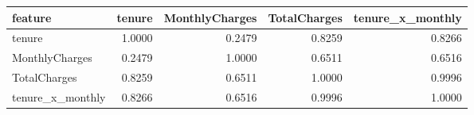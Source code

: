 \begin{tabular}{lrrrr}
\toprule
feature & tenure & MonthlyCharges & TotalCharges & tenure\_x\_monthly \\
\midrule
tenure & 1.0000 & 0.2479 & 0.8259 & 0.8266 \\
MonthlyCharges & 0.2479 & 1.0000 & 0.6511 & 0.6516 \\
TotalCharges & 0.8259 & 0.6511 & 1.0000 & 0.9996 \\
tenure\_x\_monthly & 0.8266 & 0.6516 & 0.9996 & 1.0000 \\
\bottomrule
\end{tabular}

